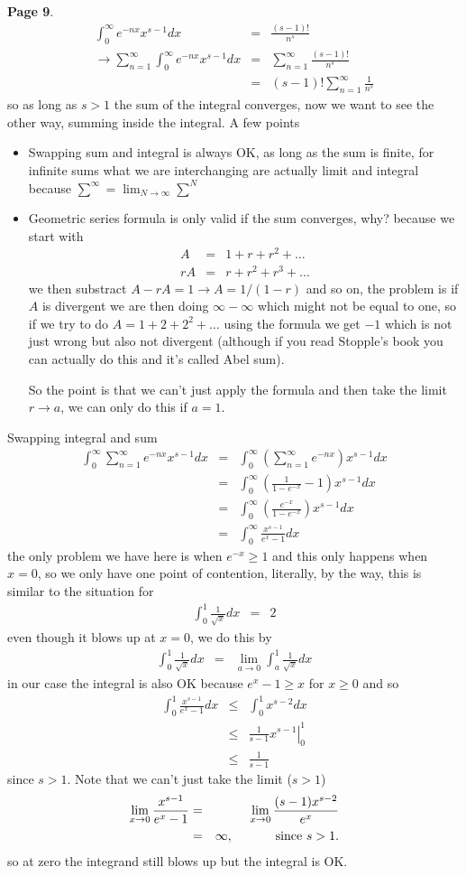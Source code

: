 \documentclass[aps,preprint,preprintnumbers,nofootinbib,showpacs,prd]{revtex4-1}
\newcommand{\bit}{\begin{itemize}}
\newcommand{\eit}{\end{itemize}}
\newcommand{\nbea}{\begin{eqnarray*}}
\newcommand{\neea}{\end{eqnarray*}}
\begin{document}
{\bf Page 9}.
%
\nbea
\int_0^\infty e^{-nx} x^{s-1} dx & = & \frac{(s-1)!}{n^s} \\
\to \sum_{n=1}^\infty \int_0^\infty e^{-nx} x^{s-1} dx & = & \sum_{n=1}^\infty \frac{(s-1)!}{n^s} \\
& = & (s-1)!\sum_{n=1}^\infty \frac{1}{n^s}
\neea
%
so as long as $s > 1$ the sum of the integral converges, now we want to see the other way, summing inside the integral. A few points
%
\bit
\item Swapping sum and integral is always OK, as long as the sum is finite, for infinite sums what we are interchanging are actually limit and integral because $\sum^\infty = \lim_{N\to\infty}\sum^N$
%
\item Geometric series formula is only valid if the sum converges, why? because we start with
%
\nbea
A & = & 1 + r + r^2 + \dots \\
rA & = & r + r^2 + r^3 + \dots
\neea
%
we then substract $A - rA = 1\to A = 1/(1-r)$ and so on, the problem is if $A$ is divergent we are then doing $\infty - \infty$ which might not be equal to one, so if we try to do $A = 1 + 2 + 2^2 + \dots$ using the formula we get $-1$ which is not just wrong but also not divergent (although if you read Stopple's book you can actually do this and it's called Abel sum).

So the point is that we can't just apply the formula and then take the limit $r\to a$, we can only do this if $a = 1$.
\eit
%

Swapping integral and sum
%
\nbea
\int_0^\infty \sum_{n=1}^\infty e^{-nx} x^{s-1} dx & = & \int_0^\infty \left(\sum_{n=1}^\infty e^{-nx}\right) x^{s-1} dx \\
& = & \int_0^\infty \left (\frac{1}{1-e^{-x}} - 1 \right ) x^{s-1} dx \\
& = & \int_0^\infty \left (\frac{e^{-x}}{1-e^{-x}}\right ) x^{s-1} dx \\
& = & \int_0^\infty \frac{x^{s-1}}{e^{x} - 1} dx
\neea
%
the only problem we have here is when $e^{-x} \ge 1$ and this only happens when $x = 0$, so we only have one point of contention, literally, by the way, this is similar to the situation for
%
\nbea
\int_0^1 \frac{1}{\sqrt{x}} dx & = & 2
\neea
%
even though it blows up at $x = 0$, we do this by
%
\nbea
\int_0^1 \frac{1}{\sqrt{x}} dx & = & \lim_{a\to0}\int_a^1 \frac{1}{\sqrt{x}} dx
\neea
%
in our case the integral is also OK because $e^x - 1 \ge x$ for $x \ge 0$ and so
%
\nbea
\int_0^1 \frac{x^{s-1}}{e^{x} - 1} dx & \le & \int_0^1 x^{s-2} dx \\
& \le & \left. \frac{1}{s-1} x^{s-1} \right |_0^1 \\
& \le & \frac{1}{s-1}
\neea
%
since $s > 1$. Note that we can't just take the limit ($s > 1$)
%
\nbea
\lim_{x\to0} \frac{x^{s-1}}{e^x-1} & = & \lim_{x\to0} \frac{(s-1)x^{s-2}}{e^x} \\
& = & \infty, ~~~~~~~~~~{\rm  since~} s > 1.
\neea
%
so at zero the integrand still blows up but the integral is OK.
\end{document}
